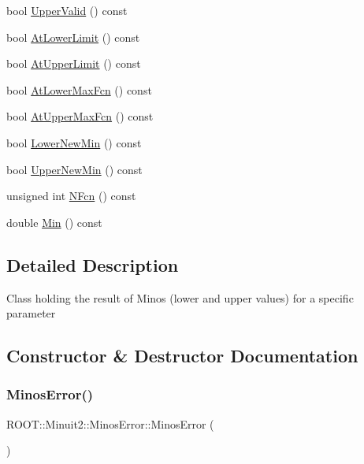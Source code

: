\begin{DoxyCompactItemize}
\item 
bool \mbox{\hyperlink{classROOT_1_1Minuit2_1_1MinosError_a4180ae7ff87d9a2c0942c8e6ac81a8c0}{Upper\+Valid}} () const
\item 
bool \mbox{\hyperlink{classROOT_1_1Minuit2_1_1MinosError_ab5bac1c70b34e42714730cad95978b51}{At\+Lower\+Limit}} () const
\item 
bool \mbox{\hyperlink{classROOT_1_1Minuit2_1_1MinosError_a6c8a60e5b855f9d7164f441ea69c75eb}{At\+Upper\+Limit}} () const
\item 
bool \mbox{\hyperlink{classROOT_1_1Minuit2_1_1MinosError_a6ec22eac3b7dd1a281f1df710ed1dc74}{At\+Lower\+Max\+Fcn}} () const
\item 
bool \mbox{\hyperlink{classROOT_1_1Minuit2_1_1MinosError_a940c974f6ac87d22c4d340ef2fc88e8c}{At\+Upper\+Max\+Fcn}} () const
\item 
bool \mbox{\hyperlink{classROOT_1_1Minuit2_1_1MinosError_a9a806056992d1acb26420bf4895b46e9}{Lower\+New\+Min}} () const
\item 
bool \mbox{\hyperlink{classROOT_1_1Minuit2_1_1MinosError_a5f37bb106903e148029b8461f9bbbe25}{Upper\+New\+Min}} () const
\item 
unsigned int \mbox{\hyperlink{classROOT_1_1Minuit2_1_1MinosError_a4956b01f7899f42847617c378e5c86c2}{N\+Fcn}} () const
\item 
double \mbox{\hyperlink{classROOT_1_1Minuit2_1_1MinosError_a109ad5c9e19a97bda32f506718eaef02}{Min}} () const
\end{DoxyCompactItemize}


\subsection{Detailed Description}
Class holding the result of Minos (lower and upper values) for a specific parameter 

\subsection{Constructor \& Destructor Documentation}
\mbox{\label{classROOT_1_1Minuit2_1_1MinosError_a5cb0fad5d73d20905a57fb1c505c9fd2}} 
\subsubsection{\texorpdfstring{MinosError()}{MinosError()}\hspace{0.1cm}{\footnotesize\ttfamily [1/6]}}
{\footnotesize\ttfamily R\+O\+O\+T\+::\+Minuit2\+::\+Minos\+Error\+::\+Minos\+Error (\begin{DoxyParamCaption}{ }\end{DoxyParamCaption})\hspace{0.3cm}{\ttfamily [inline]}}

